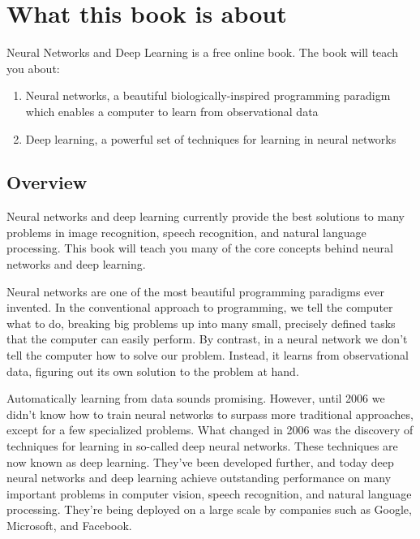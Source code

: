 
\chapter*{What this book is about}


Neural Networks and Deep Learning is a free online book. The book will teach you about: 
\begin{enumerate}
\item  Neural networks, a beautiful biologically-inspired programming paradigm which enables a computer to learn from observational data 

\item Deep learning, a powerful set of techniques for learning in neural networks 
\end{enumerate}

\section*{Overview}

Neural networks and deep learning currently provide the best solutions to many problems in image recognition, speech recognition, and natural language processing. This book will teach you many of the core concepts behind neural networks and deep learning. 

Neural networks are one of the most beautiful programming paradigms ever invented. In the conventional approach to programming, we tell the computer what to do, breaking big problems up into many small, precisely defined tasks that the computer can easily perform. By contrast, in a neural network we don't tell the computer how to solve our problem. Instead, it learns from observational data, figuring out its own solution to the problem at hand.

Automatically learning from data sounds promising. However, until 2006 we didn't know how to train neural networks to surpass more traditional approaches, except for a few specialized problems. What changed in 2006 was the discovery of techniques for learning in so-called deep neural networks. These techniques are now known as deep learning. They've been developed further, and today deep neural networks and deep learning achieve outstanding performance on many important problems in computer vision, speech recognition, and natural language processing. They're being deployed on a large scale by companies such as Google, Microsoft, and Facebook.

